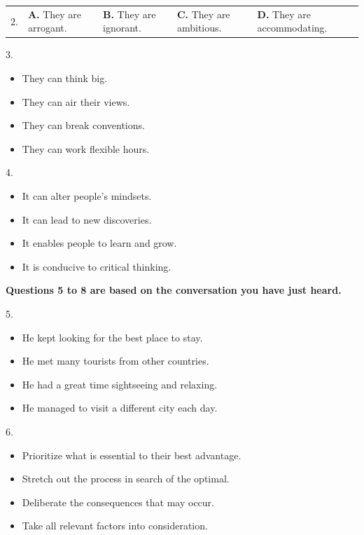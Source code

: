\documentclass[UTF8,11pt]{ctexart}
\begin{document}
\noindent\begin{tabularx}{\linewidth}{@{}lXXXX@{}}2. & \textbf{A.} They are arrogant. & \textbf{B.} They are ignorant. & \textbf{C.} They are ambitious. & \textbf{D.} They are accommodating.\\\end{tabularx}\par

3.


\begin{itemize}[leftmargin=2em,itemsep=.2em,topsep=.4em]\item[A.] They can think big.
\item[B.] They can air their views.
\item[C.] They can break conventions.
\item[D.] They can work flexible hours.
\end{itemize}

4.


\begin{itemize}[leftmargin=2em,itemsep=.2em,topsep=.4em]\item[A.] It can alter people's mindsets.
\item[B.] It can lead to new discoveries.
\item[C.] It enables people to learn and grow.
\item[D.] It is conducive to critical thinking.
\end{itemize}

\textbf{Questions 5 to 8 are based on the conversation you have just heard.}


5.


\begin{itemize}[leftmargin=2em,itemsep=.2em,topsep=.4em]\item[A.] He kept looking for the best place to stay.
\item[B.] He met many tourists from other countries.
\item[C.] He had a great time sightseeing and relaxing.
\item[D.] He managed to visit a different city each day.
\end{itemize}

6.


\begin{itemize}[leftmargin=2em,itemsep=.2em,topsep=.4em]\item[A.] Prioritize what is essential to their best advantage.
\item[B.] Stretch out the process in search of the optimal.
\item[C.] Deliberate the consequences that may occur.
\item[D.] Take all relevant factors into consideration.
\end{itemize}
\end{document}
